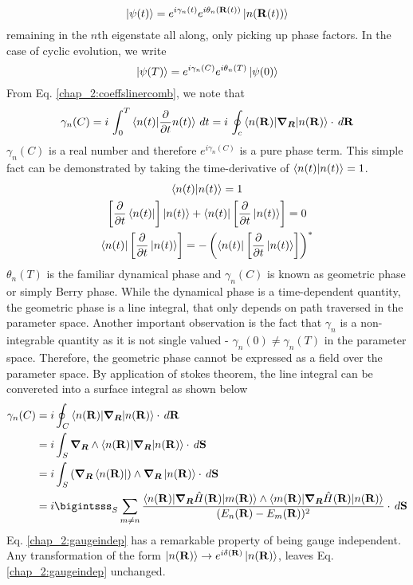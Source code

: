 \begin{equation}
 \ket{\psi(t)} = e^{i \gamma_{n}(t)} e^{i \theta_{n}(\mathbf{R}(t))} \ket{n(\mathbf{R}(t))}
\end{equation} remaining in the $n$th eigenstate all along, only picking up phase factors. In the case of cyclic evolution, we write
\begin{equation}
 \ket{\psi(T)} = e^{i \gamma_{n}(C)} e^{i \theta_{n}(T)} \ket{\psi(0)}
\end{equation}
From Eq. \eqref{chap_2:coeffslinercomb}, we note that
\begin{equation}
  \gamma_{n}(C) = i\,\int_{0}^{T}{\braket{n(t) | \frac{\partial}{\partial t} n(t)}\, dt} = i\, \oint_{c}{\braket{n(\mathbf{R})| \bm{\nabla_{R}} | n(\mathbf{R})} \cdot \, d\mathbf{R}}
\end{equation} $\gamma_{n}(C)$ is a real number and therefore $e^{i \gamma_{n}(C)}$ is a pure phase term. This simple fact can be demonstrated by taking the time-derivative 
of $\braket{n(t)|n(t)} = 1$.
\begin{gather*}
 \braket{n(t)|n(t)} = 1 \\
 \left[\frac{\partial}{\partial t}\bra{n(t)}\right]\ket{n(t)} + \bra{n(t)}\left[ \frac{\partial}{\partial t}\ket{n(t)}\right] = 0 \\
 \bra{n(t)}\left[\frac{\partial}{\partial t}\ket{n(t)}\right] = -\left(\bra{n(t)}\left[\frac{\partial}{\partial t}\ket{n(t)}\right]\right)^{*}
\end{gather*}
$\theta_{n}(T)$ is the familiar dynamical phase and $\gamma_{n}(C)$ is known as geometric phase or simply Berry phase. While the dynamical phase is a time-dependent quantity,
the geometric phase is a line integral, that only depends on path traversed in the parameter space. Another important observation is the fact that $\gamma_{n}$ is a 
non-integrable quantity as it is not single valued - $\gamma_{n}(0) \neq \gamma_{n}(T)$ in the parameter space. Therefore, the geometric phase cannot be expressed as a field over
the parameter space. By application of stokes theorem, the line integral can be convereted into a surface integral as shown below
\begin{align}
 \gamma_{n}(C) &= i \oint_{C}{\braket{n(\mathbf{R})| \bm{\nabla_{R}} | n(\mathbf{R})} \cdot \, d\mathbf{R}} \nonumber \\
 &= i \int_{S}{\bm{\nabla_{R}} \wedge \braket{n(\mathbf{R})| \bm{\nabla_{R}} | n(\mathbf{R})} \cdot \, d\mathbf{S}} \\
 &= i \int_{S}{(\bm{\nabla_{R}}\bra{n(\mathbf{R})}) \wedge \bm{\nabla_{R}}\ket{n(\mathbf{R})} \cdot \, d\mathbf{S}} \nonumber \\
 \label{chap_2:gaugeindep} &= i \bigintsss_{S}{\,\sum_{m \neq n}{\frac{\braket{n(\mathbf{R})|\bm{\nabla_{R}}\hat{H}(\mathbf{R})|m(\mathbf{R})} \wedge \braket{m(\mathbf{R})|\bm{\nabla_{R}}\hat{H}(\mathbf{R})|n(\mathbf{R})}}{(E_{n}(\mathbf{R})- E_{m}(\mathbf{R}))^2}} \cdot \, d\mathbf{S}}
\end{align}
Eq. \eqref{chap_2:gaugeindep} has a remarkable property of being gauge independent. Any transformation of the form 
$\ket{n(\mathbf{R})} \rightarrow e^{i\delta(\mathbf{R})} \ket{n(\mathbf{R})}$, leaves Eq. \eqref{chap_2:gaugeindep} unchanged. 

